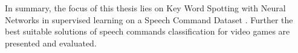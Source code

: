 In summary, the focus of this thesis lies on Key Word Spotting with Neural Networks in supervised learning on a Speech Command Dataset \cite{Warden2018}.
Further the best suitable solutions of speech commands classification for video games are presented and evaluated.





\newpage










